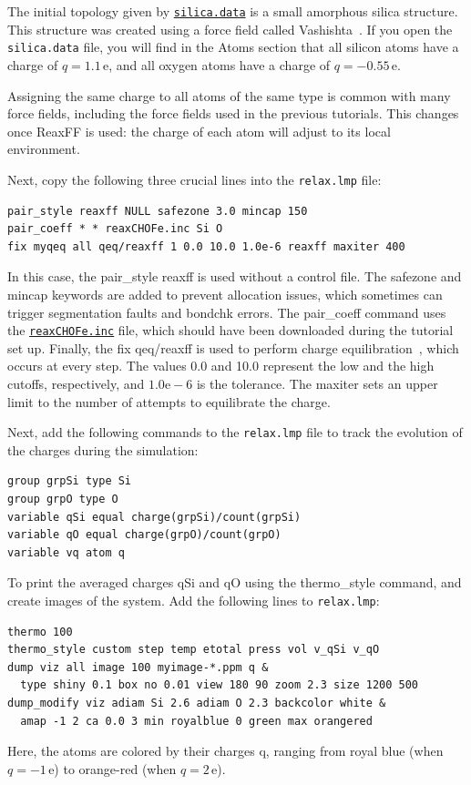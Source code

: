 \documentclass[9pt,tutorial]{livecoms}
\newcommand{\lmpcmd}[1]{\hspace{0pt}\colorbox{listing}{\textcolor{command}{\small{#1}}}\hspace{0pt}} %
\newcommand{\flecmd}[1]{\textcolor{command}{\texttt{#1}}} %
\newcommand{\dwlcmd}[1]{\textcolor{download}{\texttt{#1}}} %
\newcommand{\filepath}{https://raw.githubusercontent.com/lammpstutorials/lammpstutorials-article/main/files/}
\begin{document}
The initial topology given by \href{\filepath tutorial5/silica.data}{\dwlcmd{silica.data}}
is a small amorphous silica structure.  This structure was created using a force field called
Vashishta~\cite{vashishta1990interaction}.  If you open the \flecmd{silica.data}
file, you will find in the \lmpcmd{Atoms} section that all silicon atoms have a
charge of $q = 1.1\,\text{e}$, and all oxygen atoms have a charge of $q = -0.55\,\text{e}$.

\begin{note}
Assigning the same charge to all atoms of the same type is common with many
force fields, including the force fields used in the previous tutorials.  This
changes once ReaxFF is used: the charge of each atom will adjust to its local
environment.
\end{note}

Next, copy the following three crucial lines into the \flecmd{relax.lmp} file:
\begin{lstlisting}
pair_style reaxff NULL safezone 3.0 mincap 150
pair_coeff * * reaxCHOFe.inc Si O
fix myqeq all qeq/reaxff 1 0.0 10.0 1.0e-6 reaxff maxiter 400
\end{lstlisting}
In this case, the \lmpcmd{pair\_style reaxff} is used without a control file.  The
\lmpcmd{safezone} and \lmpcmd{mincap} keywords are added to prevent
allocation issues, which sometimes can trigger segmentation faults and
\lmpcmd{bondchk} errors.  The \lmpcmd{pair\_coeff} command uses the
\href{\filepath tutorial5/reaxCHOFe.inc}{\dwlcmd{reaxCHOFe.inc}}
file, which should have been downloaded during the tutorial set up.  Finally, the
\lmpcmd{fix qeq/reaxff} is used to perform charge equilibration~\cite{rappe1991charge},
which occurs at every step.  The values 0.0 and 10.0 represent the
low and the high cutoffs, respectively, and $1.0 \text{e} -6$ is the tolerance.
The \lmpcmd{maxiter} sets an upper limit to the number of attempts to
equilibrate the charge.

Next, add the following commands to the \flecmd{relax.lmp} file to track the
evolution of the charges during the simulation:
\begin{lstlisting}
group grpSi type Si
group grpO type O
variable qSi equal charge(grpSi)/count(grpSi)
variable qO equal charge(grpO)/count(grpO)
variable vq atom q
\end{lstlisting}
To print the averaged charges \lmpcmd{qSi} and \lmpcmd{qO} using the
\lmpcmd{thermo\_style} command, and create images of the system.  Add the
following lines to \flecmd{relax.lmp}:
\begin{lstlisting}
thermo 100
thermo_style custom step temp etotal press vol v_qSi v_qO
dump viz all image 100 myimage-*.ppm q &
  type shiny 0.1 box no 0.01 view 180 90 zoom 2.3 size 1200 500
dump_modify viz adiam Si 2.6 adiam O 2.3 backcolor white &
  amap -1 2 ca 0.0 3 min royalblue 0 green max orangered
\end{lstlisting}
Here, the atoms are colored by their charges \lmpcmd{q}, ranging from royal blue
(when $q=-1\,\text{e}$) to orange-red (when $q=2\,\text{e}$).
\end{document}
